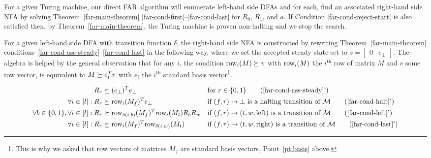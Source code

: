 For a given Turing machine, our direct FAR algorithm will enumerate left-hand side DFAs and for each, find an associated right-hand side NFA by solving Theorem~\ref{far-main-theorem} \eqref{far-cond-first}--\eqref{far-cond-last} for $R_0$, $R_1$, and $a$. If Condition \eqref{far-cond-reject-start} is also satisfied then, by Theorem~\ref{far-main-theorem}, the Turing machine is proven non-halting and we stop the search.


For a given left-hand side DFA with transition function $\delta$, the right-hand side NFA is constructed by rewriting Theorem~\ref{far-main-theorem} conditions~\eqref{far-cond-ass-steady}--\eqref{far-cond-last} in the following way, where we set the accepted steady state-set to $s=\begin{bmatrix}0&e_\bot\end{bmatrix}$. The algebra is helped by the general observation that for any $i$, the condition $\text{row}_i(M) \succeq v$ with $\text{row}_i(M)$ the $i^\text{th}$ row of matrix $M$ and $v$ some row vector, is equivalent to $M\succeq e_i^T v$ with $e_i$ the $i^\text{th}$ standard basis vector\footnote{This is why we asked that row vectors of matrices $M_f$ are standard basis vectors, Point~\ref{pt:basis} above.}.



\begin{align}
    R_r                                        & \succeq (e_\bot)\T e_\bot
                                               &                                               & \text{for }r\in\{0,1\}
    \tag{\ref{far-cond-ass-steady}'}
    \\
    \forall i\in[l]: R_r                       & \succeq \row_i(M_f)\T e_\bot
                                               &                                               & \text{if $(f,r) \to \bot$ is a halting transition of $\mathcal{M}$}
    \tag{\ref{far-cond-halt}'}
    \\
    \forall b \in\{0,1\}, \forall i\in[l]: R_r & \succeq
    \row_{\delta(i,b)}(M_f)\T \row_i(M_t)R_b R_w
                                               &                                               & \text{if $(f,r) \to (t,w,\text{left})$ is a transition of $\mathcal{M}$}
    \tag{\ref{far-cond-left}'}
    \\
    \forall i\in[l]: R_r                       & \succeq \row_i(M_f)\T \row_{\delta(i,w)}(M_t)
                                               &                                               & \text{if $(f,r) \to (t,w,\text{right})$ is a transition of $\mathcal{M}$}
    \tag{\ref{far-cond-last}'}
\end{align}

